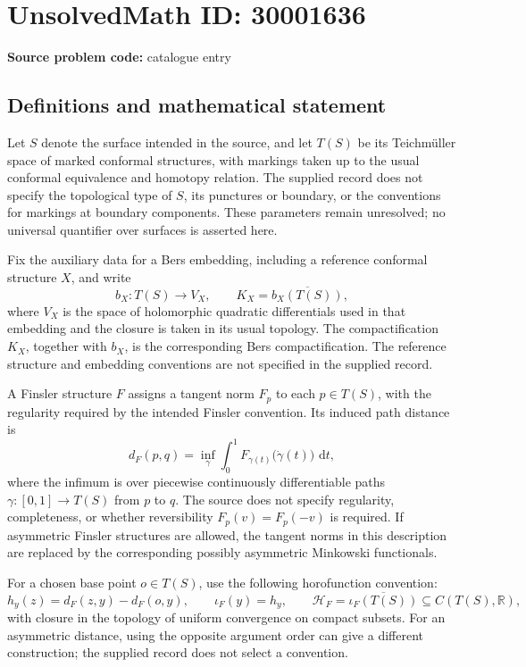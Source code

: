 \documentclass[11pt]{article}
\newcommand{\R}{\mathbb{R}}
\newcommand{\dd}{\,\mathrm{d}}
\begin{document}
\section*{UnsolvedMath ID: 30001636}
\textbf{Source problem code:} catalogue entry
\subsection{Definitions and mathematical statement}
Let \(S\) denote the surface intended in the source, and let \(T(S)\) be its Teichmüller space of marked conformal structures, with markings taken up to the usual conformal equivalence and homotopy relation. The supplied record does not specify the topological type of \(S\), its punctures or boundary, or the conventions for markings at boundary components. These parameters remain unresolved; no universal quantifier over surfaces is asserted here.

Fix the auxiliary data for a Bers embedding, including a reference conformal structure \(X\), and write
\[
 b_X:T(S)\longrightarrow V_X,
 \qquad K_X=\overline{b_X(T(S))},
\]
where \(V_X\) is the space of holomorphic quadratic differentials used in that embedding and the closure is taken in its usual topology. The compactification \(K_X\), together with \(b_X\), is the corresponding Bers compactification. The reference structure and embedding conventions are not specified in the supplied record.

A Finsler structure \(F\) assigns a tangent norm \(F_p\) to each \(p\in T(S)\), with the regularity required by the intended Finsler convention. Its induced path distance is
\[
 d_F(p,q)=\inf_{\gamma}\int_0^1 F_{\gamma(t)}\bigl(\dot\gamma(t)\bigr)\,\dd t,
\]
where the infimum is over piecewise continuously differentiable paths \(\gamma:[0,1]\to T(S)\) from \(p\) to \(q\). The source does not specify regularity, completeness, or whether reversibility \(F_p(v)=F_p(-v)\) is required. If asymmetric Finsler structures are allowed, the tangent norms in this description are replaced by the corresponding possibly asymmetric Minkowski functionals.

For a chosen base point \(o\in T(S)\), use the following horofunction convention:
\[
 h_y(z)=d_F(z,y)-d_F(o,y),\qquad
 \iota_F(y)=h_y,\qquad
 \mathcal H_F=\overline{\iota_F(T(S))}\subseteq C(T(S),\R),
\]
with closure in the topology of uniform convergence on compact subsets. For an asymmetric distance, using the opposite argument order can give a different construction; the supplied record does not select a convention.
\end{document}
